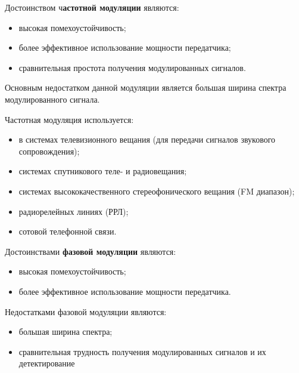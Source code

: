 \documentclass[12pt,a4paper]{scrartcl}
\begin{document}
 
  Достоинством ч\textbf{астотной модуляции} являются:

\begin{itemize}
\item высокая помехоустойчивость;
\item  более эффективное использование мощности передатчика;
\item  сравнительная простота получения модулированных сигналов.
\end{itemize}
    
Основным недостатком данной модуляции является большая ширина спектра модулированного сигнала.

Частотная модуляция используется:

\begin{itemize}
\item   в системах телевизионного вещания (для передачи сигналов звукового сопровождения);
\item   системах спутникового теле- и радиовещания;
\item  системах высококачественного стереофонического вещания (FM диапазон);
\item  радиорелейных линиях (РРЛ);
\item  сотовой телефонной связи.
\end{itemize}
  
Достоинствами \textbf{фазовой модуляции} являются:

\begin{itemize}
\item    высокая помехоустойчивость;
\item    более эффективное использование мощности передатчика.
\end{itemize}
   
Недостатками фазовой модуляции являются:

\begin{itemize}
\item  большая ширина спектра;
\item  сравнительная трудность получения модулированных сигналов и их детектирование 
\end{itemize}
\end{document}
